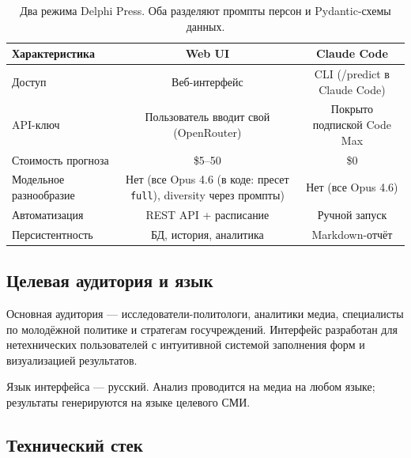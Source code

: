 \begin{table}[h]
\centering
\begin{tabular}{|l|c|c|}
\hline
\textbf{Характеристика} & \textbf{Web UI} & \textbf{Claude Code} \\
\hline
Доступ & Веб-интерфейс & CLI (/predict в Claude Code) \\
API-ключ & Пользователь вводит свой (OpenRouter) & Покрыто подпиской Code Max \\
Стоимость прогноза & \$5–50 & \$0 \\
Модельное разнообразие & Нет (все Opus 4.6 (в коде: пресет \texttt{full}), diversity через промпты) & Нет (все Opus 4.6) \\
Автоматизация & REST API + расписание & Ручной запуск \\
Персистентность & БД, история, аналитика & Markdown-отчёт \\
\hline
\end{tabular}
\caption{Два режима Delphi Press. Оба разделяют промпты персон и Pydantic-схемы данных.}
\label{tab:modes}
\end{table}

\subsection{Целевая аудитория и язык}

Основная аудитория — исследователи-политологи, аналитики медиа, специалисты по молодёжной политике и стратегам госучреждений. Интерфейс разработан для нетехнических пользователей с интуитивной системой заполнения форм и визуализацией результатов.

Язык интерфейса — русский. Анализ проводится на медиа на любом языке; результаты генерируются на языке целевого СМИ.

\subsection{Технический стек}

